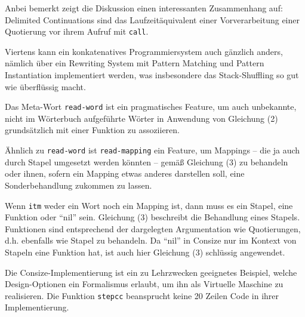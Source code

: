 Anbei bemerkt zeigt die Diskussion einen interessanten Zusammenhang auf: Delimited Continuations sind das Laufzeitäquivalent einer Vorverarbeitung einer Quotierung vor ihrem Aufruf mit \verb|call|.

Viertens kann ein konkatenatives Programmiersystem auch gänzlich anders, nämlich über ein Rewriting System mit Pattern Matching und Pattern Instantiation implementiert werden,
was insbesondere das Stack-Shuffling so gut wie überflüssig macht.

Das Meta-Wort \verb|read-word| ist ein pragmatisches Feature, um auch unbekannte, nicht im Wörterbuch aufgeführte Wörter in Anwendung von Gleichung (2) grundsätzlich mit einer Funktion zu assoziieren. 

\smallskip{}
Ähnlich zu \verb|read-word| ist \verb|read-mapping| ein Feature, um Mappings -- die ja auch durch Stapel umgesetzt werden könnten -- gemäß Gleichung (3) zu behandeln oder ihnen, sofern ein Mapping etwas anderes darstellen soll, eine Sonderbehandlung zukommen zu lassen.

\smallskip{}
Wenn \verb|itm| weder ein Wort noch ein Mapping ist, dann muss es ein Stapel, eine Funktion oder "`nil"' sein. Gleichung (3) beschreibt die Behandlung eines Stapels. Funktionen sind entsprechend der dargelegten Argumentation wie Quotierungen, d.h. ebenfalls wie Stapel zu behandeln. Da "`nil"' in Consize nur im Kontext von Stapeln eine Funktion hat, ist auch hier Gleichung (3) schlüssig angewendet.

\smallskip\noindent Die Consize-Implementierung ist ein zu Lehrzwecken geeignetes Beispiel, welche Design-Optionen ein Formalismus erlaubt, um ihn als Virtuelle Maschine zu realisieren. Die Funktion \verb|stepcc| beansprucht keine 20 Zeilen Code in ihrer Implementierung. 





